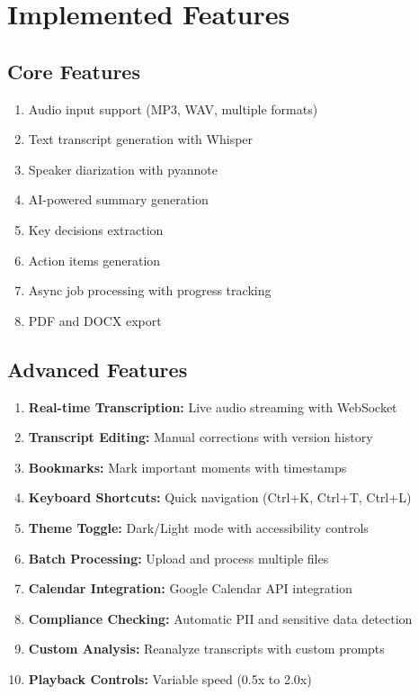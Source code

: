 \documentclass[11pt,a4paper]{article}
\begin{document}
\section*{Implemented Features}

\subsection*{Core Features}
\begin{enumerate}[leftmargin=*, itemsep=4pt]
    \item Audio input support (MP3, WAV, multiple formats)
    \item Text transcript generation with Whisper
    \item Speaker diarization with pyannote
    \item AI-powered summary generation
    \item Key decisions extraction
    \item Action items generation
    \item Async job processing with progress tracking
    \item PDF and DOCX export
\end{enumerate}

\subsection*{Advanced Features}
\begin{enumerate}[leftmargin=*, itemsep=4pt, resume]
    \item \textbf{Real-time Transcription:} Live audio streaming with WebSocket
    \item \textbf{Transcript Editing:} Manual corrections with version history
    \item \textbf{Bookmarks:} Mark important moments with timestamps
    \item \textbf{Keyboard Shortcuts:} Quick navigation (Ctrl+K, Ctrl+T, Ctrl+L)
    \item \textbf{Theme Toggle:} Dark/Light mode with accessibility controls
    \item \textbf{Batch Processing:} Upload and process multiple files
    \item \textbf{Calendar Integration:} Google Calendar API integration
    \item \textbf{Compliance Checking:} Automatic PII and sensitive data detection
    \item \textbf{Custom Analysis:} Reanalyze transcripts with custom prompts
    \item \textbf{Playback Controls:} Variable speed (0.5x to 2.0x)
\end{enumerate}
\end{document}
